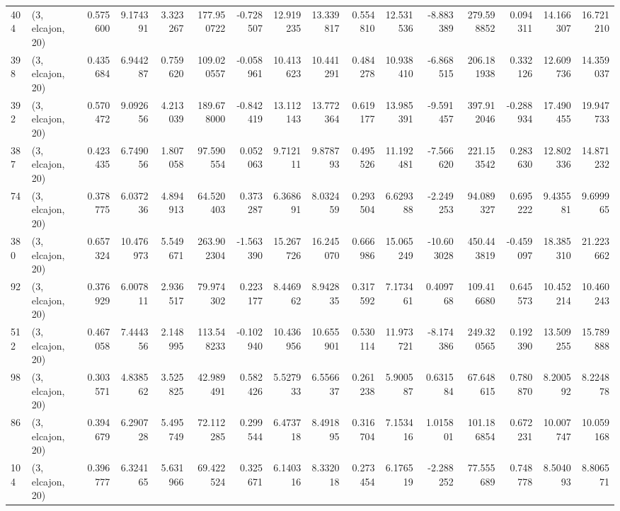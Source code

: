 \begin{tabular}{llrrrrrrrrrrrrrr}
404 &  (3, elcajon, 20) &   0.575600 &   9.174391 &   3.323267 &   177.950722 &  -0.728507 &  12.919235 &  13.339817 &  0.554810 &  12.531536 &  -8.883389 &    279.598852 &   0.094311 &  14.166307 &   16.721210 \\
398 &  (3, elcajon, 20) &   0.435684 &   6.944287 &   0.759620 &   109.020557 &  -0.058961 &  10.413623 &  10.441291 &  0.484278 &  10.938410 &  -6.868515 &    206.181938 &   0.332126 &  12.609736 &   14.359037 \\
392 &  (3, elcajon, 20) &   0.570472 &   9.092656 &   4.213039 &   189.678000 &  -0.842419 &  13.112143 &  13.772364 &  0.619177 &  13.985391 &  -9.591457 &    397.912046 &  -0.288934 &  17.490455 &   19.947733 \\
387 &  (3, elcajon, 20) &   0.423435 &   6.749056 &   1.807058 &    97.590554 &   0.052063 &   9.712111 &   9.878793 &  0.495526 &  11.192481 &  -7.566620 &    221.153542 &   0.283630 &  12.802336 &   14.871232 \\
74  &  (3, elcajon, 20) &   0.378775 &   6.037236 &   4.894913 &    64.520403 &   0.373287 &   6.368691 &   8.032459 &  0.293504 &   6.629388 &  -2.249253 &     94.089327 &   0.695222 &   9.435581 &    9.699965 \\
380 &  (3, elcajon, 20) &   0.657324 &  10.476973 &   5.549671 &   263.902304 &  -1.563390 &  15.267726 &  16.245070 &  0.666986 &  15.065249 & -10.603028 &    450.443819 &  -0.459097 &  18.385310 &   21.223662 \\
92  &  (3, elcajon, 20) &   0.376929 &   6.007811 &   2.936517 &    79.974302 &   0.223177 &   8.446962 &   8.942835 &  0.317592 &   7.173461 &   0.409768 &    109.416680 &   0.645573 &  10.452214 &   10.460243 \\
512 &  (3, elcajon, 20) &   0.467058 &   7.444356 &   2.148995 &   113.548233 &  -0.102940 &  10.436956 &  10.655901 &  0.530114 &  11.973721 &  -8.174386 &    249.320565 &   0.192390 &  13.509255 &   15.789888 \\
98  &  (3, elcajon, 20) &   0.303571 &   4.838562 &   3.525825 &    42.989491 &   0.582426 &   5.527933 &   6.556637 &  0.261238 &   5.900587 &   0.631584 &     67.648615 &   0.780870 &   8.200592 &    8.224878 \\
86  &  (3, elcajon, 20) &   0.394679 &   6.290728 &   5.495749 &    72.112285 &   0.299544 &   6.473718 &   8.491895 &  0.316704 &   7.153416 &   1.015801 &    101.186854 &   0.672231 &  10.007747 &   10.059168 \\
104 &  (3, elcajon, 20) &   0.396777 &   6.324165 &   5.631966 &    69.422524 &   0.325671 &   6.140316 &   8.332018 &  0.273454 &   6.176519 &  -2.288252 &     77.555689 &   0.748778 &   8.504093 &    8.806571 \\

\end{tabular}
